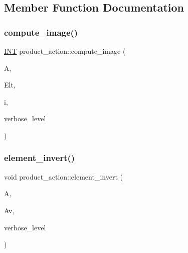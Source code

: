 \subsection{Member Function Documentation}
\mbox{\label{classproduct__action_a0fe5c6d4c44c698b9c47f1122173a702}} 
\subsubsection{\texorpdfstring{compute\+\_\+image()}{compute\_image()}}
{\footnotesize\ttfamily \mbox{\hyperlink{galois_8h_a09fddde158a3a20bd2dcadb609de11dc}{I\+NT}} product\+\_\+action\+::compute\+\_\+image (\begin{DoxyParamCaption}\item[{\mbox{\hyperlink{classaction}{action}} $\ast$}]{A,  }\item[{\mbox{\hyperlink{galois_8h_a09fddde158a3a20bd2dcadb609de11dc}{I\+NT}} $\ast$}]{Elt,  }\item[{\mbox{\hyperlink{galois_8h_a09fddde158a3a20bd2dcadb609de11dc}{I\+NT}}}]{i,  }\item[{\mbox{\hyperlink{galois_8h_a09fddde158a3a20bd2dcadb609de11dc}{I\+NT}}}]{verbose\+\_\+level }\end{DoxyParamCaption})}

\mbox{\label{classproduct__action_ae7aff4ee19365e0e9a271377b45ce6d4}} 
\subsubsection{\texorpdfstring{element\+\_\+invert()}{element\_invert()}}
{\footnotesize\ttfamily void product\+\_\+action\+::element\+\_\+invert (\begin{DoxyParamCaption}\item[{\mbox{\hyperlink{galois_8h_a09fddde158a3a20bd2dcadb609de11dc}{I\+NT}} $\ast$}]{A,  }\item[{\mbox{\hyperlink{galois_8h_a09fddde158a3a20bd2dcadb609de11dc}{I\+NT}} $\ast$}]{Av,  }\item[{\mbox{\hyperlink{galois_8h_a09fddde158a3a20bd2dcadb609de11dc}{I\+NT}}}]{verbose\+\_\+level }\end{DoxyParamCaption})}

